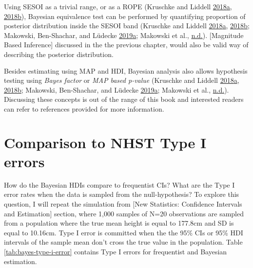 \documentclass[
]{book}
\begin{document}
Using SESOI as a trivial range, or as a ROPE (Kruschke and Liddell \protect\hyperlink{ref-kruschkeBayesianDataAnalysis2018}{2018}\protect\hyperlink{ref-kruschkeBayesianDataAnalysis2018}{a}, \protect\hyperlink{ref-kruschkeBayesianNewStatistics2018}{2018}\protect\hyperlink{ref-kruschkeBayesianNewStatistics2018}{b}), Bayesian equivalence test can be performed by quantifying proportion of posterior distribution inside the SESOI band (Kruschke and Liddell \protect\hyperlink{ref-kruschkeBayesianDataAnalysis2018}{2018}\protect\hyperlink{ref-kruschkeBayesianDataAnalysis2018}{a}, \protect\hyperlink{ref-kruschkeBayesianNewStatistics2018}{2018}\protect\hyperlink{ref-kruschkeBayesianNewStatistics2018}{b}; Makowski, Ben-Shachar, and Lüdecke \protect\hyperlink{ref-makowskiBayestestRDescribingEffects2019}{2019}\protect\hyperlink{ref-makowskiBayestestRDescribingEffects2019}{a}; Makowski et al., \protect\hyperlink{ref-makowskiIndicesEffectExistence}{n.d.}). {[}Magnitude Based Inference{]} discussed in the the previous chapter, would also be valid way of describing the posterior distribution.

Besides estimating using MAP and HDI, Bayesian analysis also allows hypothesis testing using \emph{Bayes factor} or \emph{MAP based p-value} (Kruschke and Liddell \protect\hyperlink{ref-kruschkeBayesianDataAnalysis2018}{2018}\protect\hyperlink{ref-kruschkeBayesianDataAnalysis2018}{a}, \protect\hyperlink{ref-kruschkeBayesianNewStatistics2018}{2018}\protect\hyperlink{ref-kruschkeBayesianNewStatistics2018}{b}; Makowski, Ben-Shachar, and Lüdecke \protect\hyperlink{ref-makowskiBayestestRDescribingEffects2019}{2019}\protect\hyperlink{ref-makowskiBayestestRDescribingEffects2019}{a}; Makowski et al., \protect\hyperlink{ref-makowskiIndicesEffectExistence}{n.d.}). Discussing these concepts is out of the range of this book and interested readers can refer to references provided for more information.

\hypertarget{comparison-to-nhst-type-i-errors}{%
\section{Comparison to NHST Type I errors}\label{comparison-to-nhst-type-i-errors}}

How do the Bayesian HDIs compare to frequentist CIs? What are the Type I error rates when the data is sampled from the null-hypothesis? To explore this question, I will repeat the simulation from {[}New Statistics: Confidence Intervals and Estimation{]} section, where 1,000 samples of N=20 observations are sampled from a population where the true mean height is equal to 177.8cm and SD is equal to 10.16cm. Type I error is committed when the the 95\% CIs or 95\% HDI intervals of the sample mean don't cross the true value in the population. Table \ref{tab:bayes-type-i-error} contains Type I errors for frequentist and Bayesian estimation.
\end{document}
